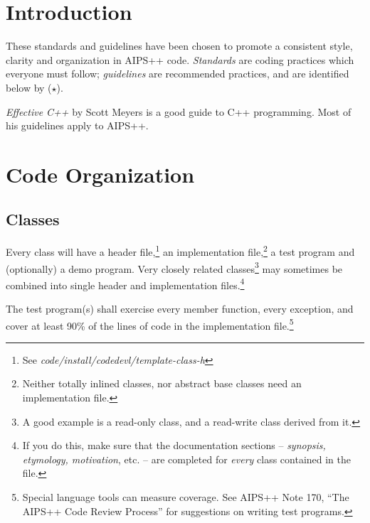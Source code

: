 \section {Introduction}
These standards and guidelines have been chosen to promote a consistent
style, clarity and organization in AIPS++ code.  {\em Standards} are
coding practices which everyone must follow; {\em guidelines} are
recommended practices, and are identified below by ($\star$).  

{\it Effective C++} by Scott Meyers is a good guide to C++ programming.  
Most of his guidelines apply to AIPS++. 
\section {Code Organization}
\subsection {Classes}  Every class will have a header file,\footnote{See
{\em code/install/codedevl/template-class-h}} 
an implementation file,\footnote {Neither totally inlined classes, nor
abstract base classes need an implementation file.} a test program
and (optionally) a demo program.  Very closely related
classes\footnote {A good example is a read-only class, and a read-write
class derived from it.}  may sometimes be combined into single header
and implementation files.\footnote {If you do this, make sure that the
documentation sections -- {\em synopsis, etymology, motivation}, etc. -- 
are completed for {\em every} class contained in the file.}

The test program(s) shall exercise every member function, every exception, and 
cover at least 90\% of the lines of code in the implementation file.\footnote
{Special language tools can measure coverage.  See AIPS++ Note 170,
``The AIPS++ Code Review Process'' for suggestions on writing test programs.}

